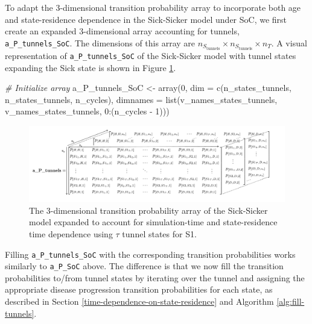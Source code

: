 \documentclass[
]{article}
\newenvironment{Shaded}{\begin{snugshade}}{\end{snugshade}}
\newcommand{\AttributeTok}[1]{\textcolor[rgb]{0.77,0.63,0.00}{#1}}
\newcommand{\CommentTok}[1]{\textcolor[rgb]{0.56,0.35,0.01}{\textit{#1}}}
\newcommand{\DecValTok}[1]{\textcolor[rgb]{0.00,0.00,0.81}{#1}}
\newcommand{\FunctionTok}[1]{\textcolor[rgb]{0.00,0.00,0.00}{#1}}
\newcommand{\NormalTok}[1]{#1}
\newcommand{\OtherTok}[1]{\textcolor[rgb]{0.56,0.35,0.01}{#1}}
\newcommand{\SpecialCharTok}[1]{\textcolor[rgb]{0.00,0.00,0.00}{#1}}
\begin{document}
To adapt the 3-dimensional transition probability array to incorporate both age and state-residence dependence in the Sick-Sicker model under SoC, we first create an expanded 3-dimensional array accounting for tunnels, \texttt{a\_P\_tunnels\_SoC}. The dimensions of this array are \(n_{S_{\text{tunnels}}} \times n_{S_{\text{tunnels}}} \times n_T\). A visual representation of \texttt{a\_P\_tunnels\_SoC} of the Sick-Sicker model with tunnel states expanding the Sick state is shown in Figure \ref{fig:Array-Time-Dependent-Tunnels}.

\begin{Shaded}
\begin{Highlighting}[]
\CommentTok{\# Initialize array}
\NormalTok{a\_P\_tunnels\_SoC }\OtherTok{\textless{}{-}} \FunctionTok{array}\NormalTok{(}\DecValTok{0}\NormalTok{, }\AttributeTok{dim =} \FunctionTok{c}\NormalTok{(n\_states\_tunnels, n\_states\_tunnels, n\_cycles),}
                         \AttributeTok{dimnames =} \FunctionTok{list}\NormalTok{(v\_names\_states\_tunnels, }
\NormalTok{                                         v\_names\_states\_tunnels, }
                                         \DecValTok{0}\SpecialCharTok{:}\NormalTok{(n\_cycles }\SpecialCharTok{{-}} \DecValTok{1}\NormalTok{)))}
\end{Highlighting}
\end{Shaded}

\begin{figure}[H]

{\centering \includegraphics[width=1\linewidth]{figs/Figure 4 - 3D-state-transition-array-sick-sicker-tunnels} 

}

\caption{The 3-dimensional transition probability array of the Sick-Sicker model expanded to account for simulation-time and state-residence time dependence using $\tau$ tunnel states for S1.}\label{fig:Array-Time-Dependent-Tunnels}
\end{figure}

Filling \texttt{a\_P\_tunnels\_SoC} with the corresponding transition probabilities works similarly to \texttt{a\_P\_SoC} above. The difference is that we now fill the transition probabilities to/from tunnel states by iterating over the tunnel and assigning the appropriate disease progression transition probabilities for each state, as described in Section \ref{time-dependence-on-state-residence} and Algorithm \ref{alg:fill-tunnels}.
\end{document}
